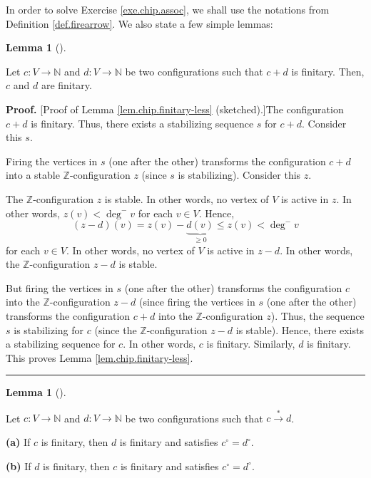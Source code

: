 \documentclass[numbers=enddot,12pt,final,onecolumn,notitlepage]{scrartcl}%
\theoremstyle{definition}
\newtheorem{lem}[theo]{Lemma}
\newenvironment{lemma}[1][]
{\begin{lem}[#1]\begin{leftbar}}
{\end{leftbar}\end{lem}}
\newenvironment{proof}[1][Proof]{\noindent\textbf{#1.} }{\ \rule{0.5em}{0.5em}}
\begin{document}
In order to solve Exercise \ref{exe.chip.assoc}, we shall use the notations
from Definition \ref{def.firearrow}. We also state a few simple lemmas:

\begin{lemma}
\label{lem.chip.finitary-less}Let $c:V\rightarrow\mathbb{N}$ and
$d:V\rightarrow\mathbb{N}$ be two configurations such that $c+d$ is finitary.
Then, $c$ and $d$ are finitary.
\end{lemma}

\begin{proof}
[Proof of Lemma \ref{lem.chip.finitary-less} (sketched).]The configuration
$c+d$ is finitary. Thus, there exists a stabilizing sequence $s$ for $c+d$.
Consider this $s$.

Firing the vertices in $s$ (one after the other) transforms the configuration
$c+d$ into a stable $\mathbb{Z}$-configuration $z$ (since $s$ is stabilizing).
Consider this $z$.

The $\mathbb{Z}$-configuration $z$ is stable. In other words, no vertex of $V$
is active in $z$. In other words, $z\left(  v\right)  <\deg^{-}v$ for each
$v\in V$. Hence,%
\[
\left(  z-d\right)  \left(  v\right)  =z\left(  v\right)
-\underbrace{d\left(  v\right)  }_{\geq0}\leq z\left(  v\right)  <\deg^{-}v
\]
for each $v\in V$. In other words, no vertex of $V$ is active in $z-d$. In
other words, the $\mathbb{Z}$-configuration $z-d$ is stable.

But firing the vertices in $s$ (one after the other) transforms the
configuration $c$ into the $\mathbb{Z}$-configuration $z-d$ (since firing the
vertices in $s$ (one after the other) transforms the configuration $c+d$ into
the $\mathbb{Z}$-configuration $z$). Thus, the sequence $s$ is stabilizing for
$c$ (since the $\mathbb{Z}$-configuration $z-d$ is stable). Hence, there
exists a stabilizing sequence for $c$. In other words, $c$ is finitary.
Similarly, $d$ is finitary. This proves Lemma \ref{lem.chip.finitary-less}.
\end{proof}

\begin{lemma}
\label{lem.chip.finitary-arrow}Let $c:V\rightarrow\mathbb{N}$ and
$d:V\rightarrow\mathbb{N}$ be two configurations such that $c\overset{\ast
}{\rightarrow}d$.

\textbf{(a)} If $c$ is finitary, then $d$ is finitary and satisfies $c^{\circ
}=d^{\circ}$.

\textbf{(b)} If $d$ is finitary, then $c$ is finitary and satisfies $c^{\circ
}=d^{\circ}$.
\end{lemma}
\end{document}
